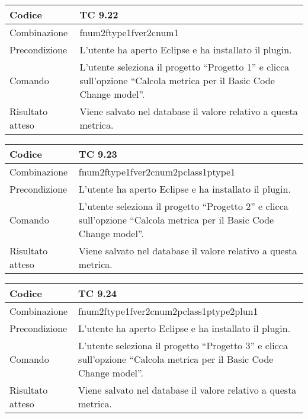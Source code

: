 \clearpage

\begin{table}[ht]
\begin{tabular}{|p{3cm}|p{9cm}|}
\hline
\cellcolor{lightgray}Codice				& TC 9.22								\\
\hline
\cellcolor{lightgray}Combinazione		& fnum2ftype1fver2cnum1									\\
\hline
\cellcolor{lightgray}Precondizione		& L'utente ha aperto Eclipse e ha installato il plugin.		\\
\hline
\cellcolor{lightgray}Comando			& L'utente seleziona il progetto ``Progetto 1''  e clicca sull'opzione ``Calcola metrica per il Basic Code Change model''.	\\
\hline
\cellcolor{lightgray}Risultato atteso	& Viene salvato nel database il valore relativo a questa metrica.\\
\hline
\end{tabular}
\end{table}


\begin{table}[ht]
\begin{tabular}{|p{3cm}|p{9cm}|}
\hline
\cellcolor{lightgray}Codice				& TC 9.23								\\
\hline
\cellcolor{lightgray}Combinazione		& fnum2ftype1fver2cnum2pclass1ptype1									\\
\hline
\cellcolor{lightgray}Precondizione		& L'utente ha aperto Eclipse e ha installato il plugin.		\\
\hline
\cellcolor{lightgray}Comando			& L'utente seleziona il progetto ``Progetto 2''  e clicca sull'opzione ``Calcola metrica per il Basic Code Change model''.	\\
\hline
\cellcolor{lightgray}Risultato atteso	& Viene salvato nel database il valore relativo a questa metrica.\\
\hline
\end{tabular}
\end{table}


\begin{table}[ht]
\begin{tabular}{|p{3cm}|p{9cm}|}
\hline
\cellcolor{lightgray}Codice				& TC 9.24								\\
\hline
\cellcolor{lightgray}Combinazione		& fnum2ftype1fver2cnum2pclass1ptype2plun1									\\
\hline
\cellcolor{lightgray}Precondizione		& L'utente ha aperto Eclipse e ha installato il plugin.		\\
\hline
\cellcolor{lightgray}Comando			& L'utente seleziona il progetto ``Progetto 3''  e clicca sull'opzione ``Calcola metrica per il Basic Code Change model''.	\\
\hline
\cellcolor{lightgray}Risultato atteso	& Viene salvato nel database il valore relativo a questa metrica.\\
\hline
\end{tabular}
\end{table}


